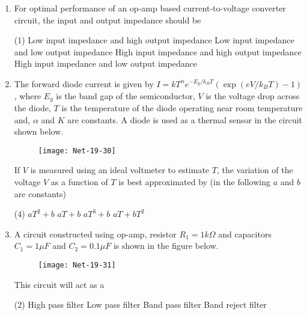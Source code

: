 \begin{enumerate}
At a fixed value of $a$, the critical value of $b$, above which the minimum of $F$ will be at a non-zero value of magnetisation, is
 \begin{tasks}(4)
	\task[\textbf{a.}]$\sqrt{\frac{10 a}{3}}$
	\task[\textbf{b.}]$\sqrt{\frac{16 a}{3}}$
	\task[\textbf{c.}] $\frac{10}{3} \sqrt{a}$
	\task[\textbf{d.}] $\frac{16}{3} \sqrt{a}$
\end{tasks}
\item For optimal performance of an op-amp based current-to-voltage converter circuit, the input and output impedance should be
 \begin{tasks}(1)
	\task[\textbf{a.}] Low input impedance and high output impedance
	\task[\textbf{b.}]Low input impedance and low output impedance
	\task[\textbf{c.}] High input impedance and high output impedance
	\task[\textbf{d.}] High input impedance and low output impedance
\end{tasks}
\item The forward diode current is given by $I=k T^{\alpha} e^{-E_{g} / k_{B} T}\left(\exp \left(e V / k_{B} T\right)-1\right)$, where $E_{g}$ is the band gap of the semiconductor, $V$ is the voltage drop across the diode, $T$ is the temperature of the diode operating near room temperature and, $\alpha$ and $K$ are constants. A diode is used as a thermal sensor in the circuit shown below.
\begin{figure}[H]
	\centering
	\texttt{[image: Net-19-30]}
\end{figure}
If $V$ is measured using an ideal voltmeter to estimate $T$, the variation of the voltage $V$ as a function of $T$ is best approximated by (in the following $a$ and $b$ are constants)
 \begin{tasks}(4)
	\task[\textbf{a.}] $a T^{2}+b$
	\task[\textbf{b.}] $a T+b$
	\task[\textbf{c.}] $a T^{3}+b$
	\task[\textbf{d.}] $a T+b T^{2}$
\end{tasks}
\item A circuit constructed using op-amp, resistor $R_{1}=1 k \Omega$ and capacitors $C_{1}=1 \mu F$ and $C_{2}=0.1 \mu F$ is shown in the figure below.
\begin{figure}[H]
	\centering
	\texttt{[image: Net-19-31]}
\end{figure}
This circuit will act as a
 \begin{tasks}(2)
	\task[\textbf{a.}]High pass filter
	\task[\textbf{b.}]Low pass filter
	\task[\textbf{c.}]Band pass filter
	\task[\textbf{d.}]Band reject filter 
\end{tasks}

\end{enumerate}
